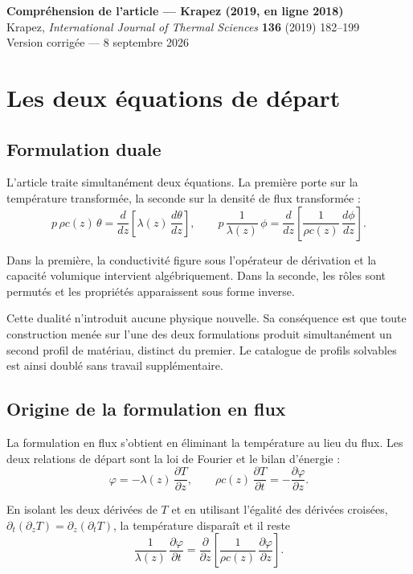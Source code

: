 \documentclass[11pt,a4paper]{article}
\begin{document}
\begin{center}
{\Large\bfseries Compréhension de l'article --- Krapez (2019, en ligne 2018)}\\[4pt]
{\small Krapez, \emph{International Journal of Thermal Sciences} \textbf{136} (2019) 182--199}\\[2pt]
{\small Version corrigée --- 8 septembre 2026}
\end{center}

\vspace{4pt}


\section{Les deux équations de départ}

\subsection{Formulation duale}

L'article traite simultanément deux équations. La première porte sur la température transformée,
la seconde sur la densité de flux transformée :
\[ p\,\rho c(z)\,\theta = \frac{d}{dz}\!\left[\lambda(z)\,\frac{d\theta}{dz}\right] ,
\qquad
p\,\frac{1}{\lambda(z)}\,\phi = \frac{d}{dz}\!\left[\frac{1}{\rho c(z)}\,\frac{d\phi}{dz}\right] . \]

Dans la première, la conductivité figure sous l'opérateur de dérivation et la capacité volumique
intervient algébriquement. Dans la seconde, les rôles sont permutés et les propriétés apparaissent
sous forme inverse.

Cette dualité n'introduit aucune physique nouvelle. Sa conséquence est que toute construction menée sur
l'une des deux formulations produit simultanément un second profil de matériau, distinct du premier.
Le catalogue de profils solvables est ainsi doublé sans travail supplémentaire.

\subsection{Origine de la formulation en flux}

La formulation en flux s'obtient en éliminant la température au lieu du flux. Les deux relations de
départ sont la loi de Fourier et le bilan d'énergie :
\[ \varphi = -\lambda(z)\,\frac{\partial T}{\partial z} ,
\qquad
\rho c(z)\,\frac{\partial T}{\partial t} = -\frac{\partial\varphi}{\partial z} . \]

En isolant les deux dérivées de $T$ et en utilisant l'égalité des dérivées croisées,
$\partial_t(\partial_z T) = \partial_z(\partial_t T)$, la température disparaît et il reste
\[ \frac{1}{\lambda(z)}\,\frac{\partial\varphi}{\partial t}
= \frac{\partial}{\partial z}\!\left[\frac{1}{\rho c(z)}\,\frac{\partial\varphi}{\partial z}\right] . \]
\end{document}
